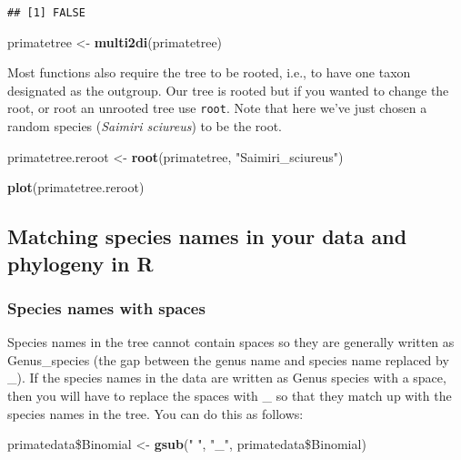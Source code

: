 \documentclass[11pt]{article}
\newcommand{\KeywordTok}[1]{\textcolor[rgb]{0.13,0.29,0.53}{\textbf{{#1}}}}
\newcommand{\StringTok}[1]{\textcolor[rgb]{0.31,0.60,0.02}{{#1}}}
\newcommand{\NormalTok}[1]{{#1}}
\begin{document}
\begin{verbatim}
## [1] FALSE
\end{verbatim}

\begin{snugshade}
\begin{Highlighting}[]
\NormalTok{primatetree <-}\StringTok{ }\KeywordTok{multi2di}\NormalTok{(primatetree)}
\end{Highlighting}
\end{snugshade}

Most functions also require the tree to be rooted, i.e., to have one taxon designated as the outgroup. Our tree is rooted but if you wanted to change the root, or root an unrooted tree use \texttt{root}. Note that here we've just chosen a random species (\textit{Saimiri sciureus}) to be the root.

\begin{snugshade}
\begin{Highlighting}[]
\NormalTok{primatetree.reroot <-}\StringTok{ }\KeywordTok{root}\NormalTok{(primatetree, }\StringTok{"Saimiri_sciureus"}\NormalTok{)  }

\KeywordTok{plot}\NormalTok{(primatetree.reroot)}
\end{Highlighting}
\end{snugshade}

\subsection{Matching species names in your data and phylogeny in R}

\subsubsection{Species names with spaces} 
Species names in the tree cannot contain spaces so they are generally written as Genus\_species (the gap between the genus name and species name replaced by \_). If the species names in the data are written as Genus species with a space, then you will have to replace the spaces with \_ so that they match up with the species names in the tree. You can do this as follows:

\begin{snugshade}
\begin{Highlighting}[]
\NormalTok{primatedata\$Binomial <-}\StringTok{ }\KeywordTok{gsub}\NormalTok{(}\StringTok{" "}\NormalTok{, }\StringTok{"_"}\NormalTok{, primatedata\$Binomial)}
\end{Highlighting}
\end{snugshade}
\end{document}
